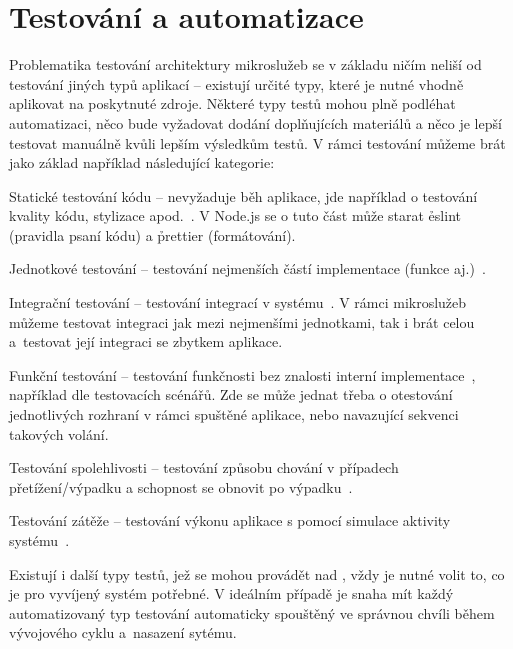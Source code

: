 \section{Testování a automatizace}\label{sec:testing}

Problematika testování architektury mikroslužeb se v základu ničím neliší od testování jiných typů aplikací – existují určité typy, které je nutné vhodně aplikovat na poskytnuté zdroje.
Některé typy testů mohou plně podléhat automatizaci, něco bude vyžadovat dodání doplňujících materiálů a něco je lepší testovat manuálně kvůli lepším výsledkům testů.
V rámci testování  můžeme brát jako základ například následující kategorie:

\begin{dl}
   \item[Statické testování kódu] – nevyžaduje běh aplikace, jde například o testování kvality kódu, stylizace apod.~\cite{statictest}.
   V Node.js se o tuto část může starat \h{eslint} (pravidla psaní kódu) a \h{prettier} (formátování).
   \item[Jednotkové testování] – testování nejmenších částí implementace (funkce aj.)~\cite{unitinttest}.
   \item[Integrační testování] – testování integrací v systému~\cite{unitinttest}.
   V rámci mikroslužeb můžeme testovat integraci jak mezi nejmenšími jednotkami, tak i brát celou  a~testovat její integraci se zbytkem aplikace.
   \item[Funkční testování] – testování funkčnosti bez znalosti interní implementace~\cite{testtypes}, například dle testovacích scénářů.
   Zde se může jednat třeba o otestování jednotlivých rozhraní v rámci spuštěné aplikace, nebo navazující sekvenci takových volání.
   \item[Testování spolehlivosti] – testování způsobu chování v případech přetížení/výpadku a schopnost se obnovit po výpadku~\cite{testtypes2}.
   \item[Testování zátěže] – testování výkonu aplikace s pomocí simulace aktivity systému~\cite{loadtest}.
\end{dl}

Existují i další typy testů, jež se mohou provádět nad , vždy je nutné volit to, co je pro vyvíjený systém potřebné.
V ideálním případě je snaha mít každý automatizovaný typ testování automaticky spouštěný ve správnou chvíli během vývojového cyklu a~nasazení sytému.
